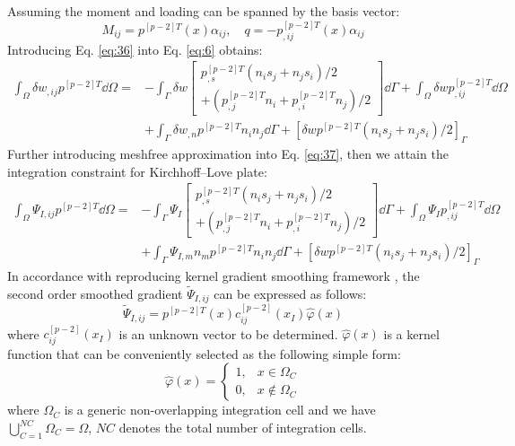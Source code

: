 Assuming the moment and loading can be spanned by the basis vector:
\begin{equation}\label{eq:36}
M_{ij}=p^{[p-2]T}(x)\alpha_{ij},\quad q=-p^{[p-2]T}_{,ij}(x)\alpha_{ij}
\end{equation}
Introducing Eq. \eqref{eq:36} into Eq. \eqref{eq:6} obtains:
\begin{equation}\label{eq:37}
\begin{aligned}
\int_{\Omega}\delta w_{,ij}p^{[p-2]T}\dd\Omega
={}&-\int_{\Gamma}\delta w\left[\begin{matrix}p^{[p-2]T}_{,s}\left(n_is_j+n_js_i\right)/2\\[2pt]
+\left(p^{[p-2]T}_{,j}n_i+p^{[p-2]T}_{,i}n_j\right)/2\end{matrix}\right]\dd\Gamma
+\int_{\Omega}\delta wp^{[p-2]T}_{,ij}\dd\Omega\\
&+\int_{\Gamma}\delta w_{,n}p^{[p-2]T}n_in_j\dd\Gamma
+\left[\delta wp^{[p-2]T}\left(n_is_j+n_js_i\right)/2\right]_{\Gamma}
\end{aligned}
\end{equation}
Further introducing meshfree approximation into Eq. \eqref{eq:37}, then we attain the integration constraint for Kirchhoff--Love plate:
\begin{equation}\label{eq:38}
\begin{aligned}
\int_{\Omega}\Psi_{I,ij}p^{[p-2]T}\dd\Omega
={}&-\int_{\Gamma}\Psi_I\left[\begin{matrix}p^{[p-2]T}_{,s}\left(n_is_j+n_js_i\right)/2\\[2pt]
+\left(p^{[p-2]T}_{,j}n_i+p^{[p-2]T}_{,i}n_j\right)/2\end{matrix}\right]\dd\Gamma
+\int_{\Omega}\Psi_Ip^{[p-2]T}_{,ij}\dd\Omega\\
&+\int_{\Gamma}\Psi_{I,m}n_mp^{[p-2]T}n_in_j\dd\Gamma
+\left[\delta wp^{[p-2]T}\left(n_is_j+n_js_i\right)/2\right]_{\Gamma}
\end{aligned}
\end{equation}
In accordance with reproducing kernel gradient smoothing framework \cite{ref43}, the second order smoothed gradient $\tilde{\Psi}_{I,ij}$ can be expressed as follows:
\begin{equation}\label{eq:39}
\tilde{\Psi}_{I,ij}=p^{[p-2]T}(x)c_{ij}^{[p-2]}(x_I)\hat{\varphi}(x)
\end{equation}
where $c_{ij}^{[p-2]}(x_I)$ is an unknown vector to be determined.
$\hat{\varphi}(x)$ is a kernel function that can be conveniently selected as the following simple form:
\begin{equation}\label{eq:40}
\hat{\varphi}(x)=\begin{cases}
1, & x\in\Omega_C\\[2pt]
0, & x\notin\Omega_C
\end{cases}
\end{equation}
where $\Omega_C$ is a generic non-overlapping integration cell and we have $\bigcup_{C=1}^{NC}\Omega_C=\Omega$, $NC$ denotes the total number of integration cells.

